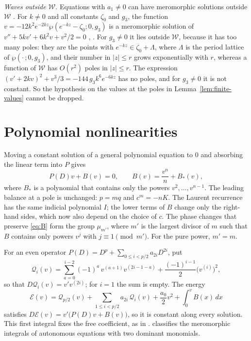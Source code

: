 \documentclass[11pt]{article}
\theoremstyle{definition}
\theoremstyle{remark}
\numberwithin{equation}{section}
\newcommand{\Wclass}{\mathcal W}
\begin{document}
\emph{Waves outside \(\Wclass\).} Equations with \(a_1\ne0\) can have
meromorphic solutions outside \(\Wclass\)
\citep[Lemmas~4.4 and~4.5]{ConteNgWu2015}. For \(k\ne0\) and all
constants \(\zeta_0\) and \(g_3\), the function
\(v=-12k^2e^{-2kz}\wp(e^{-kz}-\zeta_0;0,g_3)\) is a meromorphic
solution of \(v''+5kv'+6k^2v+v^2/2=0\)
\citep{AblowitzZeppetella1979}, \citep[Lemma~4.4]{ConteNgWu2015}. For
\(g_3\ne0\) it lies outside \(\Wclass\), because it has too many poles:
they are the points with \(e^{-kz}\in\zeta_0+\Lambda\), where
\(\Lambda\) is the period lattice of \(\wp(\cdot\,;0,g_3)\), and their
number in \(|z|\le r\) grows exponentially with \(r\), whereas a
function of \(\Wclass\) has \(O(r^2)\) poles in \(|z|\le r\). The
expression
\((v'+2kv)^2+v^3/3=-144\,g_3k^6e^{-6kz}\) has no poles, and for
\(g_3\ne0\) it is not constant. So the hypothesis on the values at
the poles in Lemma~\ref{lem:finite-values} cannot be dropped.

\section{Polynomial nonlinearities}\label{app:general}

Moving a constant solution of a general polynomial equation to \(0\)
and absorbing the linear term into \(P\) gives
\begin{equation}\label{eq:B}
 P(D)v+B(v)=0,\qquad
 B(v)=\frac{v^n}{n}+B_*(v),
\end{equation}
where \(B_*\) is a polynomial that contains only the powers
\(v^2,\dots,v^{n-1}\). The leading balance at a pole is unchanged:
\(p=mq\) and \(c^m=-nK\). The Laurent recurrence has the same indicial
polynomial \(I\); the lower terms of \(B\) change only the right-hand
sides, which now also depend on the choice of \(c\). The phase changes
that preserve \eqref{eq:B} form the group \(\mu_{m'}\), where \(m'\) is
the largest divisor of \(m\) such that \(B\) contains only powers
\(v^j\) with \(j\equiv1\pmod{m'}\). For the pure power, \(m'=m\).

For an even operator \(P(D)=D^p+\sum_{0\le i<p/2}a_{2i}D^{2i}\), put
\[
 \mathcal Q_i(v)=\sum_{a=0}^{i-2}(-1)^a\,v^{(a+1)}v^{(2i-1-a)}
 +\frac{(-1)^{i-1}}{2}\bigl(v^{(i)}\bigr)^2 ,
\]
so that \(D\mathcal Q_i(v)=v'v^{(2i)}\); for \(i=1\) the sum is empty.
The energy
\begin{equation}\label{eq:energy}
 \mathcal E(v)=\mathcal Q_{p/2}(v)+\sum_{1\le i<p/2}a_{2i}\,\mathcal Q_i(v)
 +\frac{a_0}{2}v^2+\int_0^vB(x)\,dx
\end{equation}
satisfies \(D\mathcal E(v)=v'\bigl(P(D)v+B(v)\bigr)\), so it is constant
along every solution. This first integral fixes the free coefficient,
as in \citet*[Lemma~4]{EremenkoLiaoNg2009}. \citet{Demina2019} classifies the meromorphic integrals of autonomous
equations with two dominant monomials.
\end{document}
